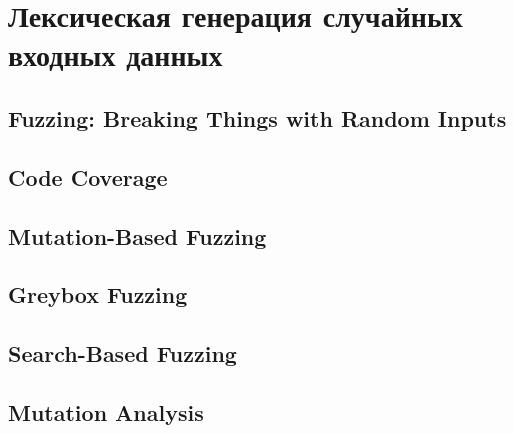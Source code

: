 \section{Лексическая генерация случайных входных данных} \label{section_2}

\subsection{Fuzzing: Breaking Things with Random Inputs}


\subsection{Code Coverage}


\subsection{Mutation-Based Fuzzing}


\subsection{Greybox Fuzzing}


\subsection{Search-Based Fuzzing}


\subsection{Mutation Analysis}
